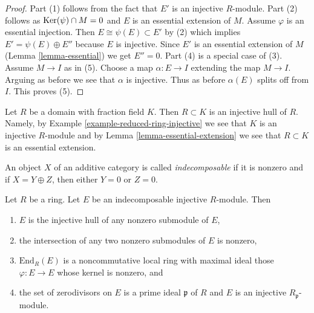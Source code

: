\begin{proof}
Part (1) follows from the fact that $E'$ is an injective $R$-module.
Part (2) follows as $\mathop{\mathrm{Ker}}(\psi) \cap M = 0$
and $E$ is an essential extension of $M$.
Assume $\varphi$ is an essential injection. Then
$E \cong \psi(E) \subset E'$ by (2) which implies
$E' = \psi(E) \oplus E''$ because $E$ is injective.
Since $E'$ is an essential extension of
$M$ (Lemma \ref{lemma-essential}) we get $E'' = 0$.
Part (4) is a special case of (3).
Assume $M \to I$ as in (5).
Choose a map $\alpha : E \to I$ extending the map $M \to I$.
Arguing as before we see that $\alpha$ is injective.
Thus as before $\alpha(E)$ splits off from $I$.
This proves (5).
\end{proof}

\begin{example}
\label{example-injective-hull-domain}
Let $R$ be a domain with fraction field $K$. Then $R \subset K$ is an
injective hull of $R$. Namely, by
Example \ref{example-reduced-ring-injective} we see that $K$ is an injective
$R$-module and by Lemma \ref{lemma-essential-extension} we see that
$R \subset K$ is an essential extension.
\end{example}

\begin{definition}
\label{definition-indecomposable}
An object $X$ of an additive category is called {\it indecomposable}
if it is nonzero and if $X = Y \oplus Z$, then either $Y = 0$ or $Z = 0$.
\end{definition}

\begin{lemma}
\label{lemma-indecomposable-injective}
Let $R$ be a ring. Let $E$ be an indecomposable injective $R$-module.
Then
\begin{enumerate}
\item $E$ is the injective hull of any nonzero submodule of $E$,
\item the intersection of any two nonzero submodules of $E$ is nonzero,
\item $\text{End}_R(E)$ is a noncommutative local ring with maximal
ideal those $\varphi : E \to E$ whose kernel is nonzero, and
\item the set of zerodivisors on $E$ is a prime ideal $\mathfrak p$ of $R$
and $E$ is an injective $R_\mathfrak p$-module.
\end{enumerate}
\end{lemma}

